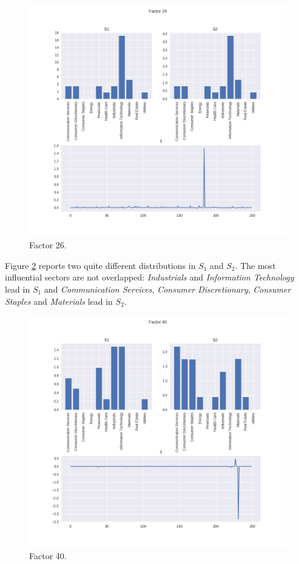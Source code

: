 \documentclass[12pt]{extarticle}
\begin{document}
\begin{figure}[!h]
	\centering
	\includegraphics[width=\textwidth]{factor_26.png}
	\caption{Factor 26.} 
	\label{fig:f26}
\end{figure}

Figure \ref{fig:f40} reports two quite different distributions in $S_1$ and $S_2$. The most influential sectors are not overlapped: \textit{Industrials} and \textit{Information Technology} lead in $S_1$ and \textit{Communication Services}, \textit{Consumer Discretionary}, \textit{Consumer Staples} and \textit{Materials} lead in $S_2$.

\begin{figure}[!h]
	\centering
	\includegraphics[width=\textwidth]{factor_40.png}
	\caption{Factor 40.} 
	\label{fig:f40}
\end{figure}
\end{document}
